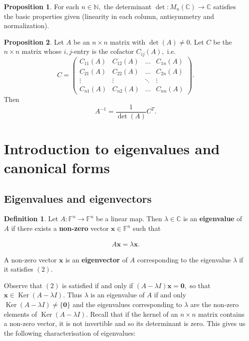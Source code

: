 \documentclass[12pt, a4paper]{article}
\theoremstyle{definition}
\newtheorem{definition}{Definition}[section]
\newtheorem{proposition}{Proposition}
\theoremstyle{plain}
\newcommand{\bb}[1]{\mathbb{#1}}
\newcommand{\vect}[1]{\mathbf{#1}}
\DeclareMathOperator{\Ker}{Ker}
\begin{document}
\begin{proposition}
For each $n \in \bb{N},$ the determinant $\det : M_n(\bb{C}) \rightarrow \bb{C}$ satisfies the basic properties given (linearity in each column, antisymmetry and normalization).
\end{proposition}

\begin{proposition} Let $A$ be an $n\times n$ matrix with $\det(A) \neq 0.$ Let $C$ be the $n\times n$ matrix whose $i,j$-entry is the cofactor $C_{ij}(A),$ i.e. 
$$C=\begin{pmatrix}
C_{11}(A)&C_{12}(A)&\ldots&C_{1n}(A)\\
C_{21}(A)&C_{22}(A)&\ldots&C_{2n}(A)\\
\vdots&\vdots&\ddots&\vdots\\
C_{n1}(A)&C_{n2}(A)&\ldots&C_{nn}(A)
\end{pmatrix}.$$ Then $$A^{-1}=\frac{1}{\det{(A)}}C^T.$$

\end{proposition}

\section{Introduction to eigenvalues and canonical forms}

\subsection{Eigenvalues and eigenvectors}

\begin{definition}
Let $A : \bb{F}^n \rightarrow \bb{F}^n$ be a linear map. Then $\lambda \in \bb{C}$ is an \textbf{eigenvalue} of $A$ if there exists a \textbf{non-zero} vector $\vect{x} \in \bb{F}^n$ such that 

\begin{align}A\vect{x}=\lambda\vect{x}.\end{align}

A non-zero vector $\vect{x}$ is an \textbf{eigenvector} of $A$ corresponding to the eigenvalue $\lambda$ if it satisfies $(2).$
\end{definition}

Observe that $(2)$ is satisfied if and only if $(A -\lambda I)\vect{x} = \vect{0},$ so that $\vect{x} \in \Ker{(A -\lambda I)}.$ Thus $\lambda$ is an eigenvalue of $A$ if and only $\Ker{(A - \lambda I)} \neq \{\vect{0}\}$ and the eigenvalues corresponding to $\lambda$ are the non-zero elements of $\Ker{(A - \lambda I)}.$ Recall that if the kernel of an $n \times n$ matrix contains a non-zero vector, it is not invertible and so its determinant is zero. This gives us the following characterisation of eigenvalues:
\end{document}
